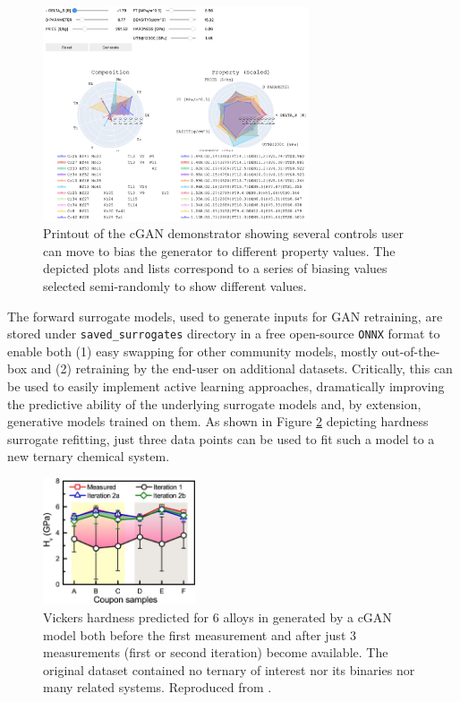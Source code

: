 \begin{figure}[H]
    \centering
    \includegraphics[width=0.7\textwidth]{inversedesign/cgan_demo.png}
    \caption{Printout of the cGAN demonstrator showing several controls user can move to bias the generator to different property values. The depicted plots and lists correspond to a series of biasing values selected semi-randomly to show different values.}
    \label{inverse:fig:cgandemo}
\end{figure}

The forward surrogate models, used to generate inputs for GAN retraining, are stored under \texttt{saved\_surrogates} directory in a free open-source \texttt{ONNX} format to enable both (1) easy swapping for other community models, mostly out-of-the-box and (2) retraining by the end-user on additional datasets. Critically, this can be used to easily implement active learning approaches, dramatically improving the predictive ability of the underlying surrogate models and, by extension, generative models trained on them. As shown in Figure \ref{inverse:fig:activelearn} depicting hardness surrogate refitting, just three data points can be used to fit such a model to a new ternary chemical system.

\begin{figure}[H]
    \centering
    \includegraphics[width=0.4\textwidth]{inversedesign/inverse_active.jpg}
    \caption{Vickers hardness predicted for 6  alloys in \cite{Li2024DesignExperiments} generated by a cGAN model both before the first measurement and after just 3 measurements (first or second iteration) become available. The original dataset contained no ternary of interest nor its binaries nor many related systems. Reproduced from \cite{Li2024DesignExperiments}.}
    \label{inverse:fig:activelearn}
\end{figure}







\printbibliography[heading=subbibintoc]